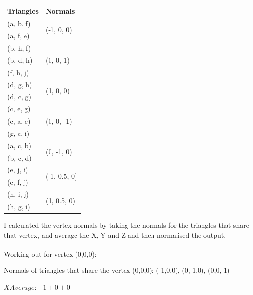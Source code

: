 \documentclass[10pt]{report}
\begin{document}
\begin{table}[H]
    \begin{tabular}{|l|l|} 
    \hline
    \textbf{ Triangles } & \textbf{Normals }              \\ 
    \hline
    (a, b, f)            & \multirow{2}{*}{(-1, 0, 0)}    \\
    (a, f, e)            &                                \\ 
    \hline
    (b, h, f)            & \multirow{3}{*}{(0, 0, 1)}     \\
    (b, d, h)            &                                \\
    (f, h, j)            &                                \\ 
    \hline
    (d, g, h)            & \multirow{2}{*}{(1, 0, 0)}     \\
    (d, c, g)            &                                \\ 
    \hline
    (c, e, g)            & \multirow{3}{*}{(0, 0, -1)}    \\
    (c, a, e)            &                                \\
    (g, e, i)            &                                \\ 
    \hline
    (a, c, b)            & \multirow{2}{*}{(0, -1, 0)}    \\
    (b, c, d)            &                                \\ 
    \hline
    (e, j, i)            & \multirow{2}{*}{(-1, 0.5, 0)}  \\
    (e, f, j)            &                                \\ 
    \hline
    (h, i, j)            & \multirow{2}{*}{(1, 0.5, 0)}   \\
    (h, g, i)            &                                \\
    \hline
    \end{tabular}
\end{table}

I calculated the vertex normals by taking the normals for the triangles that share that vertex, and average the X, Y and Z and then normalised the output.
\\\\
Working out for vertex (0,0,0):

Normals of triangles that share the vertex (0,0,0): (-1,0,0), (0,-1,0), (0,0,-1)

\(X Average: -1 + 0 + 0\)
\end{document}
